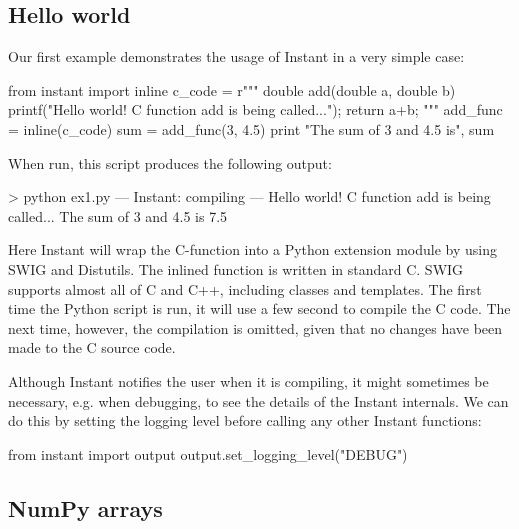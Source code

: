 \subsection{Hello world}
Our first example demonstrates the usage of Instant in a very simple case:
\begin{python}
from instant import inline
c_code = r"""
double add(double a, double b)
{
  printf("Hello world! C function add is being called...\n");
  return a+b;
}"""
add_func = inline(c_code)
sum = add_func(3, 4.5)
print "The sum of 3 and 4.5 is", sum
\end{python}
When run, this script produces the following output:
\begin{progoutput}
 > python ex1.py
--- Instant: compiling ---
Hello world! C function add is being called...
The sum of 3 and 4.5 is 7.5
\end{progoutput}
Here Instant will wrap the C-function  into a Python
extension module by using SWIG and Distutils.  The inlined function is
written in standard C. SWIG supports almost all of C and C++,
including classes and templates.  The first time the Python script is
run, it will use a few second to compile the C code.  The next time,
however, the compilation is omitted, given that no changes have been
made to the C source code.


Although Instant notifies the user when it is compiling, it might
sometimes be necessary, e.g. when debugging, to see the details of the
Instant internals. We can do this by setting the logging level before
calling any other Instant functions:
\begin{python}
from instant import output
output.set_logging_level("DEBUG")
\end{python}

\subsection{NumPy arrays}

